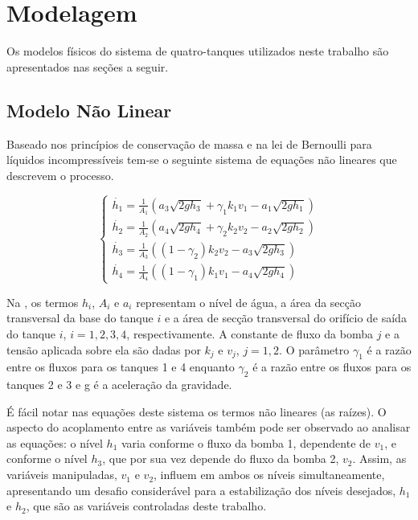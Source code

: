 %

\chapter{Modelagem}
\label{capMod}
Os modelos físicos do sistema de quatro-tanques utilizados neste trabalho são apresentados nas seções a seguir.

\section{Modelo Não Linear}
Baseado nos princípios de conservação de massa e na lei de Bernoulli para líquidos incompressíveis tem-se o seguinte sistema de equações não lineares que descrevem o processo.

\begin{equation} \label{eqModNL}
	\begin{cases}
		\dot{h_{1}} = \frac{1}{A_{1}}(a_{3}\sqrt{2gh_{3}} + \gamma_{1}k_{1}v_{1} - a_{1}\sqrt{2gh_{1}})\\
		
		\dot{h_{2}} = \frac{1}{A_{2}}(a_{4}\sqrt{2gh_{4}} + \gamma_{2}k_{2}v_{2} - a_{2}\sqrt{2gh_{2}})\\
		
		\dot{h_{3}} = \frac{1}{A_{3}}((1 - \gamma_{2})k_{2}v_{2} - a_{3}\sqrt{2gh_{3}})\\
		
		\dot{h_{4}} = \frac{1}{A_{4}}((1 - \gamma_{1})k_{1}v_{1} - a_{4}\sqrt{2gh_{4}})
	\end{cases}
\end{equation}

Na , os termos $h_{i}$, $A_{i}$ e $a_{i}$ representam o nível de água, a área da secção transversal da base do tanque $i$ e a área de secção transversal do orifício de saída do tanque $i$, $i=1,2,3,4$, respectivamente. A constante de fluxo da bomba $j$ e a tensão aplicada sobre ela são dadas por $k_{j}$ e $v_{j}$, $j=1,2$. O parâmetro $\gamma_{1}$ é a razão entre os fluxos para os tanques 1 e 4 enquanto $\gamma_{2}$ é a razão entre os fluxos para os tanques 2 e 3 e g é a aceleração da gravidade. 

É fácil notar nas equações deste sistema os termos não lineares (as raízes). O aspecto do acoplamento entre as variáveis também pode ser observado ao analisar as equações: o nível $h_1$ varia conforme o fluxo da bomba 1, dependente de $v_1$, e conforme o nível $h_3$, que por sua vez depende do fluxo da bomba 2, $v_2$. Assim, as variáveis manipuladas, $v_1$ e $v_2$, influem em ambos os níveis simultaneamente, apresentando um desafio considerável para a estabilização dos níveis desejados, $h_1$ e $h_2$, que são as variáveis controladas deste trabalho.

